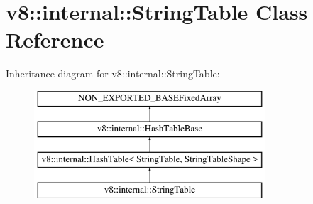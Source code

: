 \hypertarget{classv8_1_1internal_1_1StringTable}{}\section{v8\+:\+:internal\+:\+:String\+Table Class Reference}
\label{classv8_1_1internal_1_1StringTable}
Inheritance diagram for v8\+:\+:internal\+:\+:String\+Table\+:\begin{figure}[H]
\begin{center}
\leavevmode
\includegraphics[height=4.000000cm]{classv8_1_1internal_1_1StringTable}
\end{center}
\end{figure}
